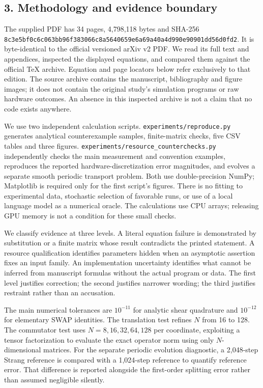 \subsection{3. Methodology and evidence
boundary}\label{methodology-and-evidence-boundary}

The supplied PDF has 34 pages, 4,798,118 bytes and SHA-256
\nolinkurl{8c3e5bf0c6c063bb96f383066c8a5640659e6a69a40a4d990e90901dd56d0fd2}.
It is byte-identical to the official versioned arXiv v2 PDF. We read its
full text and appendices, inspected the displayed equations, and
compared them against the official TeX archive. Equation and page
locators below refer exclusively to that edition. The source archive
contains the manuscript, bibliography and figure images; it does not
contain the original study's simulation programs or raw hardware
outcomes. An absence in this inspected archive is not a claim that no
code exists anywhere.

We use two independent calculation scripts.
\nolinkurl{experiments/reproduce.py} generates analytical counterexample
samples, finite-matrix checks, five CSV tables and three figures.
\nolinkurl{experiments/resource_counterchecks.py} independently checks the
main measurement and convention examples, reproduces the reported
hardware-discretization error magnitudes, and evolves a separate smooth
periodic transport problem. Both use double-precision NumPy; Matplotlib
is required only for the first script's figures. There is no fitting to
experimental data, stochastic selection of favorable runs, or use of a
local language model as a numerical oracle. The calculations use CPU
arrays; releasing GPU memory is not a condition for these small checks.

We classify evidence at three levels. A literal equation failure is
demonstrated by substitution or a finite matrix whose result contradicts
the printed statement. A resource qualification identifies parameters
hidden when an asymptotic assertion fixes an input family. An
implementation uncertainty identifies what cannot be inferred from
manuscript formulas without the actual program or data. The first level
justifies correction; the second justifies narrower wording; the third
justifies restraint rather than an accusation.

The main numerical tolerances are \(10^{-11}\) for analytic shear
quadrature and \(10^{-12}\) for elementary SWAP identities. The
translation test refines \(N\) from 16 to 128. The commutator test uses
\(N=8,16,32,64,128\) per coordinate, exploiting a tensor factorization
to evaluate the exact operator norm using only \(N\)-dimensional
matrices. For the separate periodic evolution diagnostic, a 2,048-step
Strang reference is compared with a 1,024-step reference to quantify
reference error. That difference is reported alongside the first-order
splitting error rather than assumed negligible silently.

